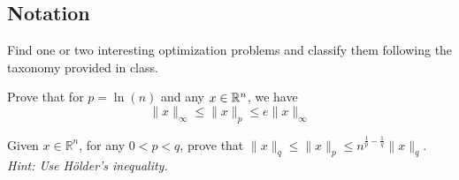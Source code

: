 \documentclass{ExerciseSheet}
\newif\ifsolutions
\begin{document}

\subsection*{Notation}
\vskip 0.5cm 
\begin{problem}
	Find one or two interesting optimization problems and classify them following the taxonomy provided in class. 
\end{problem}
\vskip 0.5cm
\begin{exo}
Prove that for $p=\ln(n)$ and any $x \in\Rn$, we have
\begin{equation*}
	\| x\|_{\infty} \leq \| x\|_p \leq e\|x\|_{\infty}
\end{equation*}
\end{exo}

\ifsolutions
\vskip 0.3cm

\begin{solution}
For the first inequality notice that for any $x \in \Rn$
\begin{equation*}
||x||_{\infty}^p=\max_{i \in [n]} |x_i|^p \leq |x_1|^p +|x_2|^p+ \cdots + |x_n|^p=||x||_p^p.
\end{equation*}
For the second inequality we observe that for $x \in \Rn$ it holds that
\begin{equation*}
	||x||_p^p=|x_1|^p+|x_2|^p +\cdots +|x_n|^p \leq n \max_{i \in [n]} |x_i|^p = n ||x||_{\infty}^p=e^p ||x||_{\infty}^p,
\end{equation*}
where the last equality follows from $p=\ln(n)$.
\end{solution}

\fi

\vskip 0.5cm

\begin{exo}
Given $x\in\mathbb{R}^n$, for any $0<p<q$, prove that $\| x \|_q \leq \| x \|_p \leq n^{\frac{1}{p}-\frac{1}{q}}\|x\|_q $.\\
\footnotesize\textit{Hint: Use H\"older's inequality.}
\end{exo}
\end{document}
